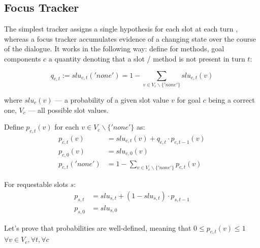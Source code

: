 \documentclass[12pt,titlepage,a4paper]{article}
\begin{document}
\subsection{Focus Tracker}

The simplest tracker assigns a single hypothesis for each slot at each turn \cite{DST}, whereas a focus tracker accumulates evidence of a changing state over the course of the dialogue. It works in the following way: define for methods, goal components $c$ a quantity denoting that a slot / method is not present in turn $t$:

\begin{equation}
    \label{eqn:q_c_t}
    q_{c,t} := slu_{c,t}('none') = 1 - \sum_{v \in V_c \backslash \{'none'\}}slu_{c,t}(v)
\end{equation}

\noindent where $slu_c(v)$ --- a probability of a given slot value $v$ for goal $c$ be\-ing a correct one, $V_c$ --- all possible slot values.

Define $p_{c,t}(v)$ for each $v \in V_c \backslash \{'none'\}$ as: 
\begin{align}
    \label{eqn:p_c_t}
    p_{c,t}(v) &=slu_{c,t}(v) + q_{c,t} \cdot p_{c,t-1}(v) \\
    \label{eqn:p_c_0}
    p_{c,0}(v) &= slu_{c,0}(v) \\
    \label{eqn:p_c_t_none}
    p_{c,t}('none') &= 1 - \sum_{v \in V_c \backslash \{'none'\}}p_{c,t}(v)
\end{align}

For requestable slots $s$: 
\begin{align}
    \label{eqn:p_s_t}
    p_{s,t} &= slu_{s,t} + (1 - slu_{s, t})\cdot p_{s,t-1} \\
    \label{eqn:p_s_0}
    p_{s,0} &= slu_{s,0}
\end{align}

Let's prove that probabilities are well-defined, meaning that $0 \leq p_{c,t}(v) \leq 1$ $\forall v \in V_c, \forall t, \forall c$
\end{document}
